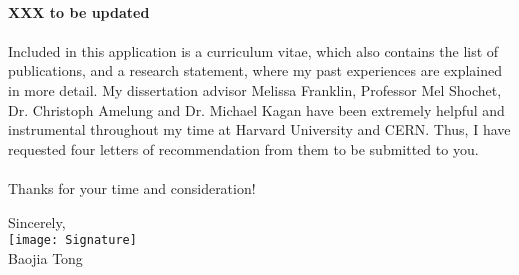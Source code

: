 \documentclass[letterpaper,11pt,oneside]{article}
\begin{document}
\paragraph{}
\textbf{XXX to be updated }

\paragraph{}
Included in this application is a curriculum vitae, which also contains the list of publications, and a research statement, where my past experiences are explained in more detail. My dissertation advisor Melissa Franklin, Professor Mel Shochet, Dr. Christoph Amelung and Dr. Michael Kagan have been extremely helpful and instrumental throughout my time at Harvard University and CERN. Thus, I have requested four letters of recommendation from them to be submitted to you.

\paragraph{}
Thanks for your time and consideration!

\begin{flushright}
Sincerely, \\
\vspace{1em} 
\texttt{[image: Signature]} \\ %
\vspace{1em} 
Baojia Tong \\
\end{flushright}
\end{document}
